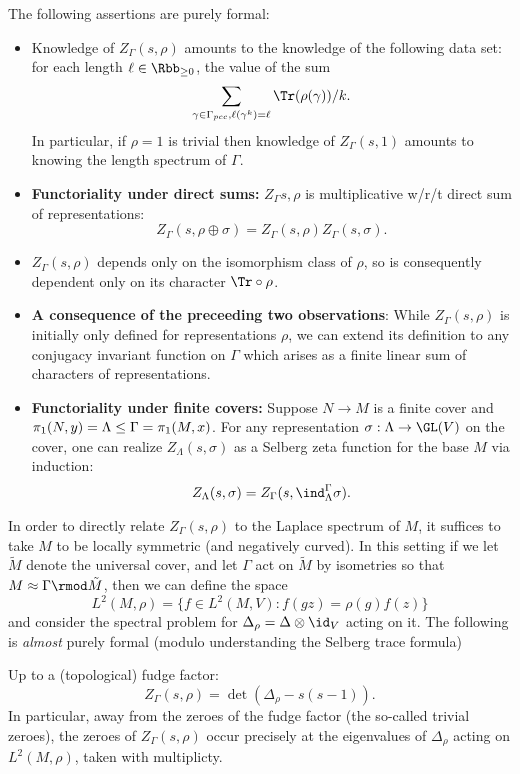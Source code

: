 \documentclass{amsart}
\begin{document}
	\begin{claim} \label{claim1}

		The following assertions are purely formal: 
		\begin{itemize}
				\item Knowledge of $Z_\Gamma(s,\rho)$  amounts to the knowledge of the following data set: for each length $\ell \in \Rbb_{\geq 0}$, the value of the sum 
					\[ \sum_{\gamma \in \Gamma_{pcc}, \ell(\gamma^k) = \ell } \Tr(\rho(\gamma))/ k. \]
				In particular, if $\rho = 1$ is trivial then knowledge of $Z_\Gamma(s,1)$ amounts to knowing the length spectrum of $\Gamma$. 
				\item \textbf{Functoriality under direct sums:} $Z_\Gamma{s, \rho}$ is multiplicative w/r/t direct sum of representations: 
					\[ Z_\Gamma(s,\rho \oplus \sigma) = Z_\Gamma(s,\rho) Z_\Gamma(s,\sigma).  \] 
				\item $Z_\Gamma(s, \rho)$ depends only on the isomorphism class of $\rho$, so is consequently dependent only on its  character $\Tr\circ \rho$. 
				\item \textbf{A consequence of the preceeding two observations}: While $Z_\Gamma(s,\rho)$ is initially only defined for representations $\rho$, we can extend its definition to any conjugacy invariant function on $\Gamma$ which arises as a finite linear sum of characters of representations.   
				\item \textbf{Functoriality under finite covers:} Suppose $N \to M$ is a finite cover and $ \pi_1(N,y) =  \Lambda \leq \Gamma = \pi_1(M,x) $. For any representation $\sigma: \Lambda \to \GL(V)$ on the cover, one can realize $Z_\Lambda(s, \sigma)$ as a Selberg zeta function for the base $M$ via induction:
					\[ Z_\Lambda(s,\sigma) = Z_\Gamma (s , \ind_{\Lambda}^{\Gamma} \sigma ). \]
		\end{itemize}
	\end{claim}
	In order to directly relate $Z_\Gamma(s,\rho)$ to the Laplace spectrum of $M$, it suffices to take $M$ to be locally symmetric (and negatively curved). In this setting if we let $\tilde{M}$ denote the universal cover, and let $\Gamma$ act on $\tilde{M}$ by isometries so that $M \approx \Gamma \rmod \tilde{M}$, then we can define the space 
		\[ L^2 (M, \rho) = \{ f \in L^2(M,V): f(gz)= \rho(g)f(z)\} \] 
	and consider the spectral problem for $\Delta_\rho = \Delta \otimes \id_V$ acting on it. The following is \emph{almost} purely formal (modulo understanding the Selberg trace formula)
		\begin{claim}
				Up to a (topological) fudge factor:
					\[ Z_\Gamma(s,\rho) = \det \left(\Delta_\rho - s(s-1)\right). \]
				In particular, away from the zeroes of the fudge factor (the so-called trivial zeroes), the zeroes of $Z_\Gamma(s,\rho)$ occur precisely at the eigenvalues of $\Delta_\rho$ acting on $L^2(M,\rho)$, taken with multiplicty.  
		\end{claim}
\end{document}
